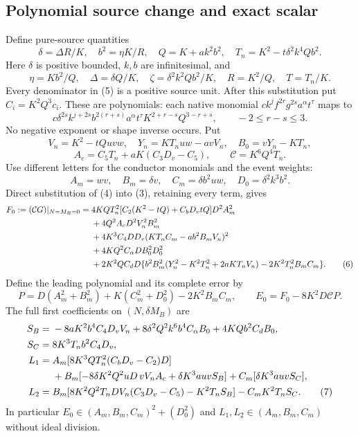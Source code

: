 \subsection{Polynomial source change and exact scalar}

Define pure-source quantities
\[
 \delta=\Delta R/K,\quad b^2=\eta K/R,\quad
 Q=K+ak^2b^2,\quad T_n=K^2-t\delta^2k^4Qb^2.
\]
Here $\delta$ is positive bounded, $k,b$ are infinitesimal, and
\begin{equation}
 \eta=Kb^2/Q,\quad \Delta=\delta Q/K,\quad
 \zeta=\delta^2k^2Qb^2/K,\quad R=K^2/Q,\quad T=T_n/K.       \tag{5}
\end{equation}
Every denominator in (5) is a positive source unit. After this
substitution put $C_i=K^2Q^3c_i$. These are polynomials: each native
monomial $c k^jf^{2r}g^{2s}a^\alpha t^\tau$ maps to
\[
 c\delta^{2s}k^{j+2s}b^{2(r+s)}a^\alpha t^\tau
 K^{2+r-s}Q^{3-r+s},\qquad -2\leq r-s\leq3.
\]
No negative exponent or shape inverse occurs. Put
\[
 V_n=K^2-tQuvw,\quad Y_n=KT_nuw-avV_n,\quad B_0=vY_n-KT_n,
\]
\[
 A_c=C_5T_n+aK(C_3D_v-C_5),\qquad \mathcal C=K^6Q^4T_n.
\]
Use different letters for the conductor monomials and the event weights:
\[
 A_m=wv,\quad B_m=\delta v,\quad C_m=\delta b^2uw,
 \quad D_0=\delta^2k^3b^2.
\]
Direct substitution of (4) into (3), retaining every term, gives
\begin{align}
 F_0:=(\mathcal CG)|_{N=M_B=0}={}&
 4KQT_n^2[C_2(K^2-tQ)+C_bD_vtQ]D^2 A_m^2\notag\\
 &+4Q^2A_cD^2V_n^2B_m^2\notag\\
 &+4K^3C_4DD_v(KT_nC_m-ab^2B_mV_n)^2\notag\\
 &+4KQ^2C_\alpha DB_0^2D_0^2\notag\\
 &+2K^2QC_dD\{b^2B_m^2(Y_n^2-K^2T_n^2+2aKT_nV_n)
                         -2K^2T_n^2B_mC_m\}.             \tag{6}
\end{align}
Define the leading polynomial and its complete error by
\[
 P=D(A_m^2+B_m^2)+K(C_m^2+D_0^2)-2K^2B_mC_m,
 \qquad E_0=F_0-8K^2D\mathcal CP.
\]
The full first coefficients on $(N,\delta M_B)$ are
\begin{align}
 S_B={}&-8aK^2b^4C_4D_vV_n
       +8\delta^2Q^2k^6b^4C_\alpha B_0+4KQb^2C_dB_0,\notag\\
 S_C={}&8K^3T_nb^2C_4D_v,\notag\\
 L_1={}&A_m[8K^3QT_n^2(C_bD_v-C_2)D]\notag\\
 &+B_m[-8\delta K^2Q^2uD\,vV_nA_c+\delta K^3auvS_B]
   +C_m[\delta K^3auvS_C],\notag\\
 L_2={}&B_m[8K^2Q^2T_nDV_n(C_3D_v-C_5)-K^2T_nS_B]
          -C_mK^2T_nS_C.                               \tag{7}
\end{align}
In particular $E_0\in(A_m,B_m,C_m)^2+(D_0^2)$ and
$L_1,L_2\in(A_m,B_m,C_m)$ without ideal division.

